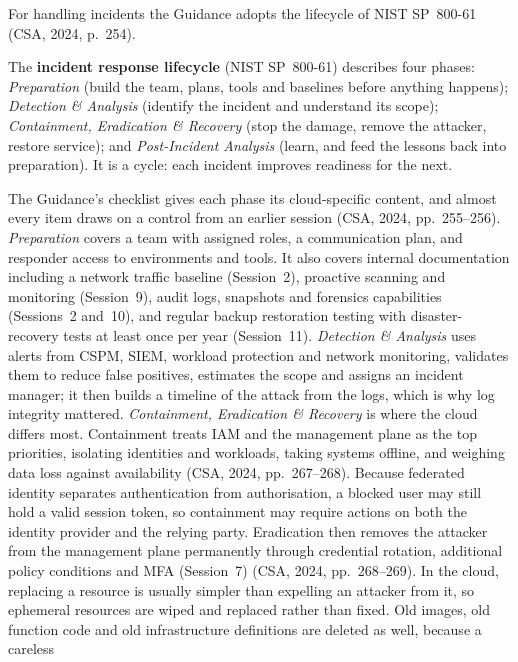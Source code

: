 For handling incidents the Guidance adopts the lifecycle of NIST
SP~800-61 (CSA, 2024, p.~254).

\begin{definition}\label{def:irlifecycle}
The \textbf{incident response lifecycle} (NIST SP~800-61) describes four
phases: \emph{Preparation} (build the team, plans, tools and baselines before
anything happens); \emph{Detection \& Analysis} (identify the incident and
understand its scope); \emph{Containment, Eradication \& Recovery} (stop the
damage, remove the attacker, restore service); and \emph{Post-Incident
Analysis} (learn, and feed the lessons back into preparation). It is a cycle:
each incident improves readiness for the next.
\end{definition}

The Guidance's checklist gives each phase its cloud-specific content, and
almost every item draws on a control from an earlier session (CSA, 2024,
pp.~255--256). \emph{Preparation} covers a team with assigned roles, a
communication plan, and responder access to environments and tools. It also
covers internal documentation including a network traffic baseline
(Session~2), proactive scanning and monitoring (Session~9), audit logs,
snapshots and forensics capabilities (Sessions~2 and~10), and regular backup
restoration testing with disaster-recovery tests at least once per year
(Session~11). \emph{Detection \& Analysis} uses alerts from CSPM, SIEM,
workload protection and network monitoring, validates them to reduce false
positives, estimates the scope and assigns an incident manager; it then
builds a timeline of the attack from the logs, which is why log integrity
mattered. \emph{Containment, Eradication \& Recovery} is where the cloud
differs most. Containment treats IAM and the management plane as the top
priorities, isolating identities and workloads, taking systems offline, and
weighing data loss against availability (CSA, 2024, pp.~267--268). Because
federated identity separates authentication from authorisation, a blocked
user may still hold a valid session token, so containment may require
actions on both the identity provider and the relying party. Eradication
then removes the attacker from the management plane permanently through
credential rotation, additional policy conditions and MFA (Session~7) (CSA,
2024, pp.~268--269). In the cloud, replacing a resource is usually simpler
than expelling an attacker from it, so ephemeral resources are wiped and
replaced rather than fixed. Old images, old function code and old
infrastructure definitions are deleted as well, because a careless
